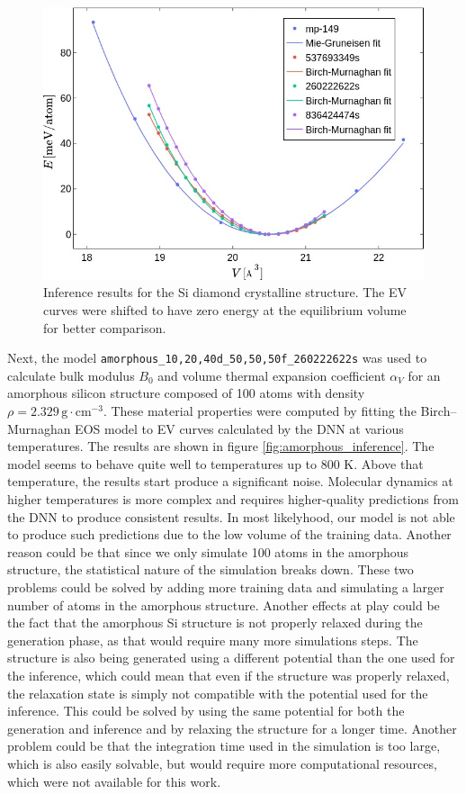 \begin{figure}
  \begin{center}
    \includegraphics[width=.8\textwidth]{
      asset/crystalline_ev_curves.jpg
    }
  \end{center}
  \caption{Inference results for the Si diamond crystalline structure. The EV
  curves were shifted to have zero energy at the equilibrium volume for better
  comparison.}
  \label{fig:crystalline_inference}
\end{figure}

Next, the model \texttt{amorphous\_10,20,40d\_50,50,50f\_260222622s} was used
to calculate bulk modulus $B_0$ and volume thermal expansion coefficient
$\alpha_{V}$ for an amorphous silicon structure composed of 100 atoms with
density $\rho = 2.329 \, \mathrm{g} \cdot \mathrm{cm}^{-3}$. These material
properties were computed by fitting the Birch--Murnaghan EOS model to EV
curves calculated by the DNN at various temperatures. The results are shown in
figure \ref{fig:amorphous_inference}. The model seems to behave quite well to
temperatures up to 800 K. Above that temperature, the results start produce a
significant noise. Molecular dynamics at higher temperatures is more complex
and requires higher-quality predictions from the DNN to produce consistent
results. In most likelyhood, our model is not able to produce such predictions
due to the low volume of the training data. Another reason could be that since
we only simulate 100 atoms in the amorphous structure, the statistical nature
of the simulation breaks down. These two problems could be solved by adding
more training data and simulating a larger number of atoms in the amorphous
structure. Another effects at play could be the fact that the amorphous Si
structure is not properly relaxed during the generation phase, as that would
require many more simulations steps. The structure is also being generated
using a different potential than the one used for the inference, which could
mean that even if the structure was properly relaxed, the relaxation state is
simply not compatible with the potential used for the inference. This could be
solved by using the same potential for both the generation and inference and
by relaxing the structure for a longer time. Another problem could be that the
integration time used in the simulation is too large, which is also easily
solvable, but would require more computational resources, which were not
available for this work.

